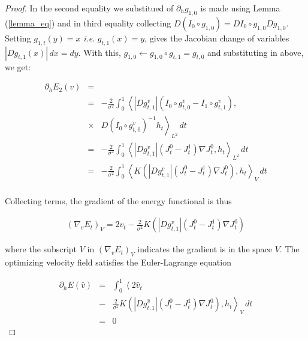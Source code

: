 \documentclass[final, paper=letter,5p,times,twocolumn]{elsarticle}
\theoremstyle{definition}
\begin{document}
{\begin{proof}
  In the second equality we substitued of $\partial_{h} g_{1,0}$ is made using Lemma (\ref{lemma_eq}) and in third equality collecting $D(I_{0} \circ g_{1,0}) = DI_{0} \circ g_{1,0}Dg_{1,0}$. Setting $g_{1,t}(y) = x$ {\it i.e}. $g_{t,1}(x) = y$, gives the Jacobian change of variables $|D g_{t,1}(x)| \, dx = dy$. With this, $g_{1,0} \leftarrow g_{1,0} \circ g_{t,1} = g_{t,0}$ and substituting in above, we get:


    \begin{equation*}
    \begin{array}{lcl}
      \partial_{h} E_{2}(v) & = & \\
      & = & - \frac{2}{\sigma^{2}} \int_{0}^{1} \left< |D g_{t,1}^{v}| (I_{0} \circ g_{t,0}^{v} - I_{1} \circ g_{t,1}^{v}), \right . \\  
      & \times & \left. D \left( I_{0} \circ g_{t,0}^{v} \right)^{-1} h_{t} \right>_{L^{2}} \, dt \\
      & = & - \frac{2}{\sigma^{2}} \int_{0}^{1} \left< |D g_{t,1}^{v}| (J_{t}^{0}  - J_{t}^{1}) \nabla J_{t}^{0}, h_{t} \right>_{L^{2}} \, dt \\
      & = & - \frac{2}{\sigma^{2}} \int_{0}^{1} \left< K \left( |D g_{t,1}^{v}| (J_{t}^{0}  - J_{t}^{1}) \nabla J_{t}^{0} \right), h_{t} \right>_{V} \, dt \\
      \end{array}
    \end{equation*}
    
    Collecting terms, the gradient of the energy functional is thus

    \begin{equation}
      \begin{array}{lcl}
        \left( \nabla_{v} E_{t} \right)_{V} = 2v_{t} - \frac{2}{\sigma^{2}} K \left( |D g_{t,1}^{v}| (J_{t}^{0}  - J_{t}^{1}) \nabla J_{t}^{0} \right)
      \end{array}
      \label{gradient_descent}
    \end{equation}

    where the subscript $V$ in $\left( \nabla_{v} E_{t} \right)_{V}$ indicates the gradient is in the space $V$. The optimizing velocity field satisfies the Euler-Lagrange equation

     \begin{equation}
      \begin{array}{lcl}
        \partial_{h}E(\hat{v}) & = & \int_{0}^{1} \left< 2\hat{v}_{t} \right .\\ 
        & - & \left. \frac{2}{\sigma^{2}} K \left( |D g_{t,1}^{\hat{v}}| (J_{t}^{0}  - J_{t}^{1}) \nabla J_{t}^{0} \right), h_{t} \right>_{V} \, dt \\
        & = & 0
      \end{array}
      \label{gradient_descent}
    \end{equation}
   

\end{proof}}
\end{document}
